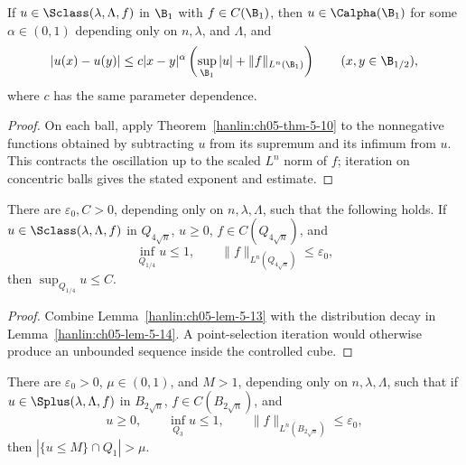 \begin{corollary}\label{hanlin:ch05-cor-5-11}
If $u\in\Sclass(\lambda,\Lambda,f)$ in $\B_1$ with $f\in C(\B_1)$,
then $u\in\Calpha(\B_1)$ for some $\alpha\in(0,1)$ depending only on
$n,\lambda$, and $\Lambda$, and
\[
|u(x)-u(y)|\leq c|x-y|^\alpha
\left(\sup_{\B_1}|u|+\|f\|_{L^n(\B_1)}\right)
\qquad(x,y\in\B_{1/2}),
\]
where $c$ has the same parameter dependence.
\end{corollary}
\begin{proof}
\sketch On each ball, apply Theorem~\ref{hanlin:ch05-thm-5-10} to the
nonnegative functions obtained by subtracting $u$ from its supremum and its
infimum from $u$. This contracts the oscillation up to the scaled $L^n$ norm
of $f$; iteration on concentric balls gives the stated exponent and estimate.
\end{proof}

\begin{lemma}\label{hanlin:ch05-lem-5-12}
There are $\varepsilon_0,C>0$, depending only on $n,\lambda,\Lambda$,
such that the following holds. If
$u\in\Sclass(\lambda,\Lambda,f)$ in $Q_{4\sqrt n}$, $u\geq0$,
$f\in C(Q_{4\sqrt n})$, and
\[
\inf_{Q_{1/4}}u\leq1,
\qquad
\|f\|_{L^n(Q_{4\sqrt n})}\leq\varepsilon_0,
\]
then $\sup_{Q_{1/4}}u\leq C$.
\end{lemma}

\begin{proof}
\sketch Combine Lemma~\ref{hanlin:ch05-lem-5-13} with the distribution
decay in Lemma~\ref{hanlin:ch05-lem-5-14}. A point-selection iteration
would otherwise produce an unbounded sequence inside the controlled cube.
\end{proof}

\begin{lemma}\label{hanlin:ch05-lem-5-13}
There are $\varepsilon_0>0$, $\mu\in(0,1)$, and $M>1$, depending
only on $n,\lambda,\Lambda$, such that if
$u\in\Splus(\lambda,\Lambda,f)$ in $B_{2\sqrt n}$,
$f\in C(B_{2\sqrt n})$, and
\[
u\geq0,\qquad \inf_{Q_3}u\leq1,\qquad
\|f\|_{L^n(B_{2\sqrt n})}\leq\varepsilon_0,
\]
then $|\{u\leq M\}\cap Q_1|>\mu$.
\end{lemma}

